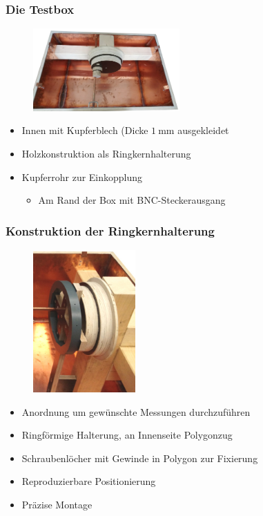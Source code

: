 \documentclass[accentcolor=tud9b, colorbacktitle, inverttitle]{tudbeamer}
\begin{document}
\begin{frame}\frametitle{Die Testbox}
\vspace{-1em}
\begin{multicols}{2}
	\begin{figure}[h]
		\centering
		\includegraphics[width=0.5\textwidth]{boxleer}
	\end{figure}
	\vfill\null
	\columnbreak
	\begin{itemize}
		\item Innen mit Kupferblech (Dicke $\SI{1}{\milli\meter}$ ausgekleidet
		\item Holzkonstruktion als Ringkernhalterung
		\item Kupferrohr zur Einkopplung
		\begin{itemize}
			\item Am Rand der Box mit BNC-Steckerausgang 
		\end{itemize}
	\end{itemize}
\end{multicols}
\end{frame}


\begin{frame}\frametitle{Konstruktion der Ringkernhalterung}
\vspace{-1em}
\begin{multicols}{2}
	\begin{figure}[h]
		\centering
		\includegraphics[width=0.35\textwidth]{BoxKreuzPolygonpraes}
	\end{figure}
	\vfill\null
	\columnbreak
	\begin{itemize}
		\item Anordnung um gew\"unschte Messungen durchzuf\"uhren
		\item Ringf\"ormige Halterung, an Innenseite Polygonzug
		\item Schraubenl\"ocher mit Gewinde in Polygon zur Fixierung
		\item Reproduzierbare Positionierung
		\item Pr\"azise Montage
	\end{itemize}
\end{multicols}
\end{frame}
\end{document}
